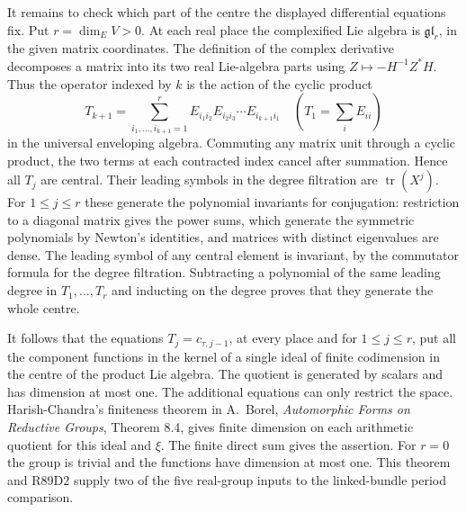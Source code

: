 It remains to check which part of the centre the displayed differential
equations fix. Put $r=\dim_E V>0$. At each real place the complexified
Lie algebra is $\mathfrak{gl}_r$, in the given matrix coordinates.
The definition of the complex derivative decomposes a matrix into its
two real Lie-algebra parts using $Z\mapsto-H^{-1} Z^* H$. Thus the
operator indexed by $k$ is the action of the cyclic product
\[
 T_{k+1}=\sum_{i_1,\ldots,i_{k+1}=1}^r
    E_{i_1 i_2} E_{i_2 i_3}\cdots E_{i_{k+1}i_1}
       \quad(T_1=\textstyle\sum_i E_{ii})
\]
in the universal enveloping algebra. Commuting any matrix unit
through a cyclic product, the two terms at each contracted index
cancel after summation. Hence all $T_j$ are central. Their leading
symbols in the degree filtration are $\operatorname{tr}(X^j)$.
For $1\le j\le r$ these generate the polynomial invariants for
conjugation: restriction to a diagonal matrix gives the power sums,
which generate the symmetric polynomials by Newton's identities,
and matrices with distinct eigenvalues are dense. The leading
symbol of any central element is invariant, by the commutator
formula for the degree filtration. Subtracting a polynomial of the
same leading degree in $T_1,\ldots,T_r$ and inducting on the degree
proves that they generate the whole centre.

It follows that the equations $T_j=c_{\tau,j-1}$, at every place
and for $1\le j\le r$, put all the component functions in the
kernel of a single ideal of finite codimension in the centre of the
product Lie algebra. The quotient is generated by scalars and
has dimension at most one. The additional equations can only
restrict the space. Harish-Chandra's finiteness theorem in
A.~Borel, \emph{Automorphic Forms on Reductive Groups},
Theorem 8.4, gives finite dimension on each arithmetic
quotient for this ideal and $\xi$. The finite direct sum gives the
assertion. For $r=0$ the group is trivial and the functions have
dimension at most one. This theorem and R89D2 supply two of the
five real-group inputs to the linked-bundle period comparison.
